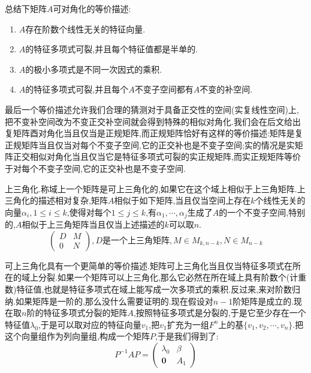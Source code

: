 总结下矩阵$A$可对角化的等价描述:
\begin{enumerate}
	\item $A$存在阶数个线性无关的特征向量.
	\item $A$的特征多项式可裂,并且每个特征值都是半单的.
	\item $A$的极小多项式是不同一次因式的乘积.
	\item $A$的特征多项式可裂,并且每个$A$不变子空间都有$A$不变的补空间.
\end{enumerate}

最后一个等价描述允许我们合理的猜测对于具备正交性的空间(实复线性空间)上,把不变补空间改为不变正交补空间就会得到特殊的相似对角化.我们会在后文给出复矩阵酉对角化当且仅当是正规矩阵,而正规矩阵恰好有这样的等价描述:矩阵是复正规矩阵当且仅当对每个不变子空间,它的正交补也是不变子空间;实的情况是实矩阵正交相似对角化当且仅当它是特征多项式可裂的实正规矩阵,而实正规矩阵等价于对每个不变子空间,它的正交补也是不变子空间.

上三角化.称域上一个矩阵是可上三角化的,如果它在这个域上相似于上三角矩阵.上三角化的描述相对复杂,矩阵$A$相似于如下矩阵,当且仅当空间上存在$k$个线性无关的向量$\alpha_i,1\le i\le k$,使得对每个$1\le j\le k$,有$\alpha_1,\cdots,\alpha_j$生成了$A$的一个不变子空间,特别的,$A$相似于上三角矩阵当且仅当上述描述的$k$可以取$n$.
$$\left(\begin{array}{cc}
D&M\\
0&N
\end{array}\right),D\text{是一个上三角矩阵},M\in M_{k,n-k},N\in M_{n-k}$$

可上三角化具有一个更简单的等价描述.矩阵可上三角化当且仅当特征多项式在所在的域上分裂.如果一个矩阵可以上三角化,那么它必然在所在域上具有阶数个(计重数)特征值,也就是特征多项式在域上能写成一次多项式的乘积.反过来,来对阶数归纳.如果矩阵是一阶的,那么没什么需要证明的.现在假设对$n-1$阶矩阵是成立的.现在取$n$阶的特征多项式分裂的矩阵$A$,按照特征多项式是分裂的,于是它至少存在一个特征值$\lambda_0$,于是可以取对应的特征向量$v_1$,把$v_1$扩充为一组$F^n$上的基$\{v_1,v_2,\cdots,v_n\}$.把这个向量组作为列向量组,构成一个矩阵$P$,于是我们得到了:
$$P^{-1}AP=\left(\begin{array}{cc}
\lambda_0&\beta\\
\textbf{0}&A_1\end{array}\right)$$

